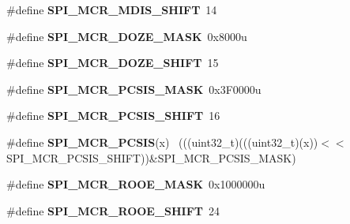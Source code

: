 \begin{DoxyCompactItemize}
\item 
\hypertarget{group___s_p_i___register___masks_gad71aeecbfd5ab69825143fb055ae3e2b}{}\#define {\bfseries S\+P\+I\+\_\+\+M\+C\+R\+\_\+\+M\+D\+I\+S\+\_\+\+S\+H\+I\+F\+T}~14\label{group___s_p_i___register___masks_gad71aeecbfd5ab69825143fb055ae3e2b}

\item 
\hypertarget{group___s_p_i___register___masks_ga1f301c07deb8544d117e752400e0e537}{}\#define {\bfseries S\+P\+I\+\_\+\+M\+C\+R\+\_\+\+D\+O\+Z\+E\+\_\+\+M\+A\+S\+K}~0x8000u\label{group___s_p_i___register___masks_ga1f301c07deb8544d117e752400e0e537}

\item 
\hypertarget{group___s_p_i___register___masks_gab24077f2090f26468c4ebe2ecfda7c5f}{}\#define {\bfseries S\+P\+I\+\_\+\+M\+C\+R\+\_\+\+D\+O\+Z\+E\+\_\+\+S\+H\+I\+F\+T}~15\label{group___s_p_i___register___masks_gab24077f2090f26468c4ebe2ecfda7c5f}

\item 
\hypertarget{group___s_p_i___register___masks_ga69de8a51e829efc59b2a2402a8210aeb}{}\#define {\bfseries S\+P\+I\+\_\+\+M\+C\+R\+\_\+\+P\+C\+S\+I\+S\+\_\+\+M\+A\+S\+K}~0x3\+F0000u\label{group___s_p_i___register___masks_ga69de8a51e829efc59b2a2402a8210aeb}

\item 
\hypertarget{group___s_p_i___register___masks_ga5130ba4524baa3be71b17af17b06b3e2}{}\#define {\bfseries S\+P\+I\+\_\+\+M\+C\+R\+\_\+\+P\+C\+S\+I\+S\+\_\+\+S\+H\+I\+F\+T}~16\label{group___s_p_i___register___masks_ga5130ba4524baa3be71b17af17b06b3e2}

\item 
\hypertarget{group___s_p_i___register___masks_ga4d1101a8f8d3f7a06ab1f05adddbc530}{}\#define {\bfseries S\+P\+I\+\_\+\+M\+C\+R\+\_\+\+P\+C\+S\+I\+S}(x)                                              ~(((uint32\+\_\+t)(((uint32\+\_\+t)(x))$<$$<$S\+P\+I\+\_\+\+M\+C\+R\+\_\+\+P\+C\+S\+I\+S\+\_\+\+S\+H\+I\+F\+T))\&S\+P\+I\+\_\+\+M\+C\+R\+\_\+\+P\+C\+S\+I\+S\+\_\+\+M\+A\+S\+K)\label{group___s_p_i___register___masks_ga4d1101a8f8d3f7a06ab1f05adddbc530}

\item 
\hypertarget{group___s_p_i___register___masks_ga2f3c41dcffc0058ae83ae7b1dbfffd86}{}\#define {\bfseries S\+P\+I\+\_\+\+M\+C\+R\+\_\+\+R\+O\+O\+E\+\_\+\+M\+A\+S\+K}~0x1000000u\label{group___s_p_i___register___masks_ga2f3c41dcffc0058ae83ae7b1dbfffd86}

\item 
\hypertarget{group___s_p_i___register___masks_ga78f4dfaad41aae2ee10979f2e248e4d3}{}\#define {\bfseries S\+P\+I\+\_\+\+M\+C\+R\+\_\+\+R\+O\+O\+E\+\_\+\+S\+H\+I\+F\+T}~24\label{group___s_p_i___register___masks_ga78f4dfaad41aae2ee10979f2e248e4d3}


\end{DoxyCompactItemize}
